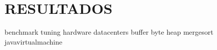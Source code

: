 \section{RESULTADOS} \label{sec:resultados}

\gls{benchmark} \gls{tuning} \gls{hardware} \gls{datacenters} \gls{buffer} \gls{byte} \gls{heap} \gls{mergesort} \gls{javavirtualmachine}